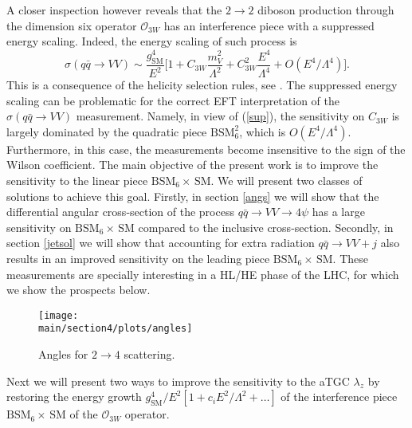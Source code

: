 A closer inspection however reveals that the  $2\to 2$ diboson production through the dimension six operator $\mathcal{O}_{3W}$  has an interference piece with a suppressed energy scaling. 
Indeed, the energy scaling of such process is  
\begin{equation}
\sigma ( q\bar q \rightarrow VV ) \sim \frac{g_\text{SM}^4}{E^2}\bigg[  1 +  C_{3W}\frac{m_V^2}{\Lambda^2}  +C_{3W}^2 \frac{E^4}{\Lambda^4}  + O(E^4/\Lambda^4) \bigg]. \label{sup}
\end{equation} 
This is a consequence of the  helicity selection rules, see    
\cite{Dixon:1993xd,Azatov:2016sqh,Azatov:2017kzw,Panico:2017frx}.
The suppressed energy scaling can be problematic for the correct EFT  
interpretation of the $\sigma(q\bar q \to V V)$ measurement. 
Namely, in view of (\ref{sup}), the sensitivity on $C_{3W}$ is largely 
dominated by the quadratic piece $\text{BSM}_6^2$, which is 
$O(E^4/\Lambda^4)$. 
 Furthermore, in this case, the measurements become insensitive to the sign of the Wilson coefficient.
The main objective of the present work is to 
improve the sensitivity to the linear piece $\text{BSM$_6\times\,$SM}$.
We will present two classes of solutions to achieve this goal. Firstly, in section \ref{angs} we  will show that the differential angular cross-section 
 of the process $q\bar q \rightarrow VV\rightarrow 4\psi$ has a large sensitivity on $\text{BSM$_6\times\,$SM}$ compared to the inclusive cross-section.   Secondly, in section \ref{jetsol} we will show that accounting for extra radiation $q\bar q \rightarrow VV+j$ also results in an improved sensitivity on the leading piece $\text{BSM$_6\times\,$SM}$.
These measurements are specially interesting in a HL/HE phase of the LHC, for which we show the prospects below.%



\begin{figure}[t]
\begin{center}
\texttt{[image: \\main/section4/plots/angles]}
\end{center}
\vspace{-.3cm}
\caption{Angles for $2\to 4$ scattering. \label{fig:ang}}
\end{figure}

Next we will present two ways to  improve the sensitivity to the aTGC $\lambda_z$ by restoring the energy growth
$g_\text{SM}^4/E^2\left[1+c_i E^2/\Lambda^2+  \dots\right]$ of the interference piece $\text{BSM$_6\times\,$SM}$ of the  $\mathcal{O}_{3W}$ operator.\\

